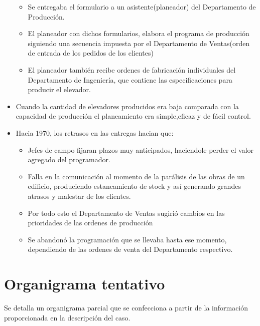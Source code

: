 \documentclass[12pt,a4paper,spanish]{article}
\begin{document}
\begin{itemize}
\begin{itemize}
		\item  Se entregaba el formulario a un asistente(planeador) del Departamento de Producci\'{o}n.
		\item El planeador con dichos formularios, elabora el programa de producci\'{o}n siguiendo una secuencia impuesta por el Departamento de Ventas(orden de entrada de los pedidos de los clientes)
		\item El planeador tambi\'{e}n recibe ordenes de fabricaci\'{o}n individuales del Departamento de Ingenier\'{i}a, que contiene las especificaciones para producir el elevador.
	\end{itemize}
	\item Cuando la cantidad de elevadores producidos era baja comparada con la capacidad de producci\'{o}n el planeamiento era simple,eficaz y de f\'{a}cil control. 
	\item Hacia 1970, los retrasos en las entregas hacian que:
	\begin{itemize}
		\item Jefes de campo fijaran plazos muy anticipados, haciendole perder el valor agregado del programador.
		\item Falla en la comunicaci\'{o}n al momento de la par\'{a}lisis de las obras de un edificio, produciendo estancamiento de stock y as\'{i} generando grandes atrasos y malestar de los clientes.
		\item Por todo esto el Departamento de Ventas sugiri\'{o} cambios en las prioridades de las ordenes de producci\'{o}n
		\item Se abandon\'{o} la programaci\'{o}n que se llevaba hasta ese momento, dependiendo de las ordenes de venta del Departamento respectivo.
	\end{itemize}
\end{itemize}

\newpage
\section{Organigrama tentativo}
Se detalla un organigrama parcial que se confecciona a partir de la informaci\'on proporcionada en la descripci\'on del caso.
\end{document}
